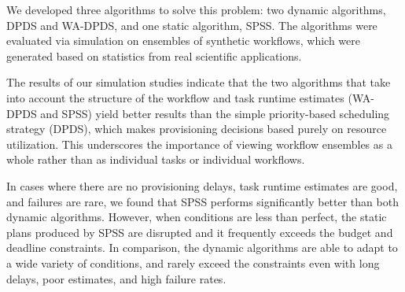 \documentclass[conference]{IEEEtran}
\begin{document}


We developed three algorithms to solve this problem: two dynamic algorithms,
DPDS and WA-DPDS, and one static algorithm, SPSS. The algorithms were
evaluated via simulation on ensembles of synthetic workflows, which were
generated based on statistics from real scientific applications.

The results of our simulation studies indicate that the two algorithms that
take into account the structure of the workflow and task runtime estimates
(WA-DPDS and SPSS) yield better results than the simple priority-based
scheduling strategy (DPDS), which makes provisioning decisions based purely on
resource utilization. This underscores the importance of viewing workflow
ensembles as a whole rather than as individual tasks or individual workflows.

In cases where there are no provisioning delays, task runtime estimates are
good, and failures are rare, we found that SPSS
performs significantly better than both dynamic algorithms. However, when
conditions are less than perfect, the static plans produced by SPSS are
disrupted and it frequently exceeds the budget and deadline constraints. In
comparison, the dynamic algorithms are able to adapt to a wide variety of
conditions, and rarely exceed the constraints even with long delays, poor
estimates, and high failure rates.

\end{document}
